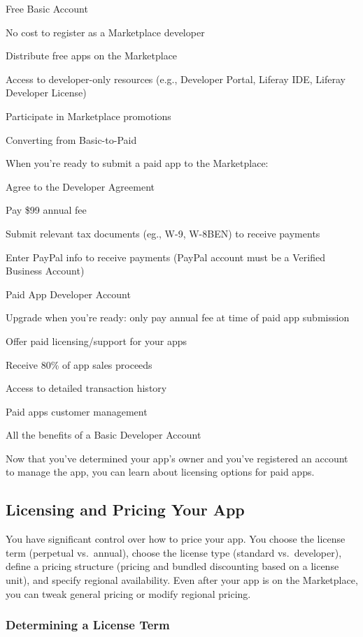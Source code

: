 Free Basic Account

No cost to register as a Marketplace developer

Distribute free apps on the Marketplace

Access to developer-only resources (e.g., Developer Portal, Liferay IDE,
Liferay Developer License)

Participate in Marketplace promotions

Converting from Basic-to-Paid

When you're ready to submit a paid app to the Marketplace:

Agree to the Developer Agreement

Pay \$99 annual fee

Submit relevant tax documents (eg., W-9, W-8BEN) to receive payments

Enter PayPal info to receive payments (PayPal account must be a Verified
Business Account)

Paid App Developer Account

Upgrade when you're ready: only pay annual fee at time of paid app
submission

Offer paid licensing/support for your apps

Receive 80\% of app sales proceeds

Access to detailed transaction history

Paid apps customer management

All the benefits of a Basic Developer Account

Now that you've determined your app's owner and you've registered an
account to manage the app, you can learn about licensing options for
paid apps.

\subsection{Licensing and Pricing Your
App}\label{licensing-and-pricing-your-app}

You have significant control over how to price your app. You choose the
license term (perpetual vs.~annual), choose the license type (standard
vs.~developer), define a pricing structure (pricing and bundled
discounting based on a license unit), and specify regional availability.
Even after your app is on the Marketplace, you can tweak general pricing
or modify regional pricing.

\subsubsection{Determining a License
Term}\label{determining-a-license-term}


